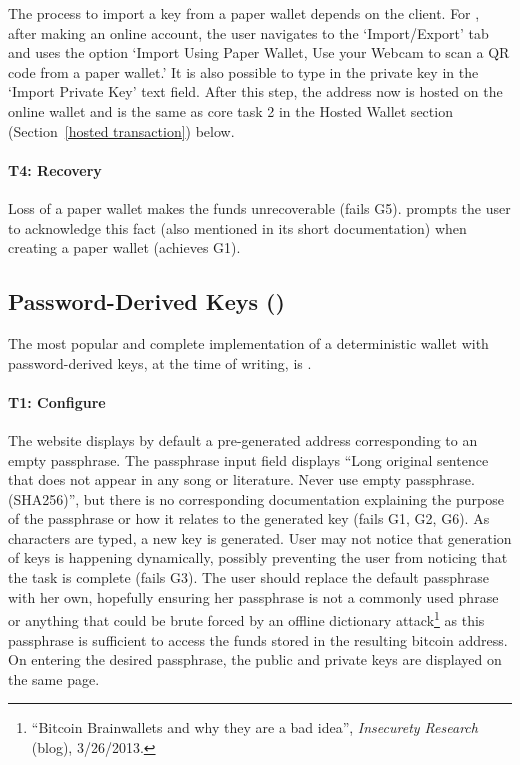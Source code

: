 The process to import a key from a paper wallet depends on the client. For \block, after making an online account, the user navigates to the `Import/Export' tab and uses the option `Import Using Paper Wallet, Use your Webcam to scan a QR code from a paper wallet.' It is also possible to type in the private key in the `Import Private Key' text field. After this step, the address now is hosted on the online wallet and is the same as core task 2 in the Hosted Wallet section (Section~\ref{hosted transaction}) below.


\paragraph{T4: Recovery} Loss of a paper wallet makes the funds unrecoverable (fails G5). \paper prompts the user to acknowledge this fact (also mentioned in its short documentation) when creating a paper wallet (achieves G1).

\subsection{Password-Derived Keys (\brain)} 
The most popular and complete implementation of a deterministic wallet with password-derived keys, at the time of writing, is \brain.

\paragraph{T1: Configure} The \brain website displays by default a pre-generated address corresponding to an empty passphrase. The passphrase input field displays ``Long original sentence that does not appear in any song or literature. Never use empty passphrase. (SHA256)'', but there is no corresponding documentation explaining the purpose of the passphrase or how it relates to the generated key (fails G1, G2, G6). As characters are typed, a new key is generated. User may not notice that generation of keys is happening dynamically, possibly preventing the user from noticing that the task is complete (fails G3). The user should replace the default passphrase with her own, hopefully ensuring her passphrase is not a commonly used phrase or anything that could be brute forced by an offline dictionary attack\footnote{``Bitcoin Brainwallets and why they are a bad idea'', \textit{Insecurety Research} (blog), 3/26/2013.} as this passphrase is sufficient to access the funds stored in the resulting bitcoin address. On entering the desired passphrase, the public and private keys are displayed on the same page.

